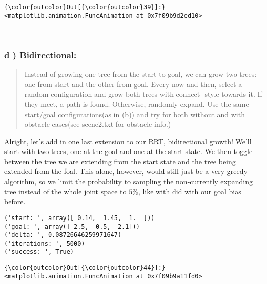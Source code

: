 \documentclass{article}
\begin{document}
            \begin{Verbatim}[commandchars=\\\{\}]
{\color{outcolor}Out[{\color{outcolor}39}]:} <matplotlib.animation.FuncAnimation at 0x7f09b9d2ed10>
\end{Verbatim}
        
    \begin{center}
    \end{center}
    { \hspace*{\fill} \\}
    

    \subsubsection{d ) Bidirectional:}


    \begin{quote}
Instead of growing one tree from the start to goal, we can grow two
trees: one from start and the other from goal. Every now and then,
select a random configuration and grow both trees with connect- style
towards it. If they meet, a path is found. Otherwise, randomly expand.
Use the same start/goal configurations(as in (b)) and try for both
without and with obstacle cases(see scene2.txt for obstacle info.)
\end{quote}

    Alright, let's add in one last extension to our RRT, bidirectional
growth! We'll start with two trees, one at the goal and one at the start
state. We then toggle between the tree we are extending from the start
state and the tree being extended from the foal. This alone, however,
would still just be a very greedy algorithm, so we limit the probability
to sampling the non-currently expanding tree instead of the whole joint
space to $5\%$, like with did with our goal bias before.



    \begin{Verbatim}[commandchars=\\\{\}]
('start: ', array([ 0.14,  1.45,  1.  ]))
('goal: ', array([-2.5, -0.5, -2.1]))
('delta: ', 0.08726646259971647)
('iterations: ', 5000)
('success: ', True)
    \end{Verbatim}




            \begin{Verbatim}[commandchars=\\\{\}]
{\color{outcolor}Out[{\color{outcolor}44}]:} <matplotlib.animation.FuncAnimation at 0x7f09b9a11fd0>
\end{Verbatim}
        
\end{document}
